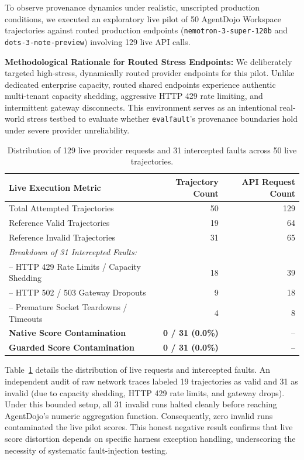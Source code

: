 To observe provenance dynamics under realistic, unscripted production conditions, we executed an exploratory live pilot of 50 AgentDojo Workspace trajectories against routed production endpoints (\texttt{nemotron-3-super-120b} and \texttt{dots-3-note-preview}) involving 129 live API calls.

\textbf{Methodological Rationale for Routed Stress Endpoints:}
We deliberately targeted high-stress, dynamically routed provider endpoints for this pilot. Unlike dedicated enterprise capacity, routed shared endpoints experience authentic multi-tenant capacity shedding, aggressive HTTP 429 rate limiting, and intermittent gateway disconnects. This environment serves as an intentional real-world stress testbed to evaluate whether \texttt{evalfault}'s provenance boundaries hold under severe provider unreliability.

\begin{table}[!t]
\centering
\caption{Distribution of 129 live provider requests and 31 intercepted faults across 50 live trajectories.}
\label{tab:live-pilot}
\footnotesize
\begin{tabular}{@{}lrr@{}}
\toprule
Live Execution Metric & Trajectory Count & API Request Count \\
\midrule
Total Attempted Trajectories & 50 & 129 \\
Reference Valid Trajectories & 19 & 64 \\
Reference Invalid Trajectories & 31 & 65 \\
\midrule
\textit{Breakdown of 31 Intercepted Faults:} & & \\
-- HTTP 429 Rate Limits / Capacity Shedding & 18 & 39 \\
-- HTTP 502 / 503 Gateway Dropouts & 9 & 18 \\
-- Premature Socket Teardowns / Timeouts & 4 & 8 \\
\midrule
\textbf{Native Score Contamination} & \textbf{0 / 31 (0.0\%)} & -- \\
\textbf{Guarded Score Contamination} & \textbf{0 / 31 (0.0\%)} & -- \\
\bottomrule
\end{tabular}
\end{table}

Table~\ref{tab:live-pilot} details the distribution of live requests and intercepted faults. An independent audit of raw network traces labeled 19 trajectories as valid and 31 as invalid (due to capacity shedding, HTTP 429 rate limits, and gateway drops). Under this bounded setup, all 31 invalid runs halted cleanly before reaching AgentDojo's numeric aggregation function. Consequently, zero invalid runs contaminated the live pilot scores. This honest negative result confirms that live score distortion depends on specific harness exception handling, underscoring the necessity of systematic fault-injection testing.


